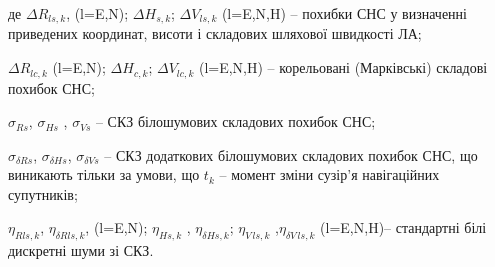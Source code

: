 \begin{ESKDexplanation}
\item де $\Delta R_{ls,k}$, (l=E,N); $\Delta H_{s,k}$; $\Delta V_{ls,k}$ 
 (l=E,N,H) -- похибки СНС у визначенні приведених  координат, висоти і складових 
шляхової швидкості ЛА;
\item $\Delta R_{lc,k}$ (l=E,N);  $\Delta H_{c,k}$; $\Delta V_{lc,k}$ 
 (l=E,N,H) -- корельовані (Марківські) складові  похибок СНС;
\item $\sigma_{Rs} $, $\sigma_{Hs}$ , $\sigma_{Vs}$  --  СКЗ білошумових складових 
похибок СНС;
\item $\sigma_{\delta Rs} $, $\sigma_{\delta Hs} $, $\sigma_{\delta Vs} $ -- СКЗ додаткових 
білошумових складових похибок СНС, що виникають тільки за умови, що $t_{k}$ -- момент 
зміни сузір'я навігаційних супутників; 
\item $\eta_{Rls,k}$, $\eta_{\delta Rls,k}$, (l=E,N); $\eta_{Hs,k}$ 
, $\eta_{\delta Hs,k}$; $\eta_{V\, ls,k}$ ,$\eta_{\delta V\, ls,k}$ 
 (l=E,N,H)-- стандартні білі дискретні шуми зі СКЗ.
\end{ESKDexplanation}

